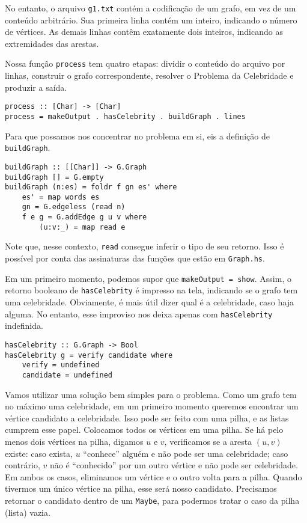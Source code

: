 \documentclass[a4paper]{article}
\begin{document}
No entanto, o arquivo \texttt{g1.txt} contém a codificação de um grafo, em vez de um conteúdo arbitrário.
Sua primeira linha contém um inteiro, indicando o número de vértices.
As demais linhas contêm exatamente dois inteiros, indicando as extremidades das arestas.

Nossa função \texttt{process} tem quatro etapas: dividir o conteúdo do arquivo por linhas, construir o grafo correspondente, resolver o Problema da Celebridade e produzir a saída.

\begin{verbatim}
process :: [Char] -> [Char]
process = makeOutput . hasCelebrity . buildGraph . lines
\end{verbatim}

Para que possamos nos concentrar no problema em si, eis a definição de \texttt{buildGraph}.

\begin{verbatim}
buildGraph :: [[Char]] -> G.Graph
buildGraph [] = G.empty
buildGraph (n:es) = foldr f gn es' where
	es' = map words es
	gn = G.edgeless (read n)
	f e g = G.addEdge g u v where
		(u:v:_) = map read e
\end{verbatim}

Note que, nesse contexto, \texttt{read} consegue inferir o tipo de seu retorno.
Isso é possível por conta das assinaturas das funções que estão em \texttt{Graph.hs}.

Em um primeiro momento, podemos supor que \texttt{makeOutput = show}. Assim, o retorno booleano de \texttt{hasCelebrity} é impresso na tela, indicando se o grafo tem uma celebridade.
Obviamente, é mais útil dizer qual é a celebridade, caso haja alguma.
No entanto, esse improviso nos deixa apenas com \texttt{hasCelebrity} indefinida.

\begin{verbatim}
hasCelebrity :: G.Graph -> Bool
hasCelebrity g = verify candidate where
	verify = undefined
	candidate = undefined
\end{verbatim}

Vamos utilizar uma solução bem simples para o problema.
Como um grafo tem no máximo uma celebridade, em um primeiro momento queremos encontrar um vértice candidato a celebridade.
Isso pode ser feito com uma pilha, e as listas cumprem esse papel.
Colocamos todos os vértices em uma pilha.
Se há pelo menos dois vértices na pilha, digamos $u$ e $v$, verificamos se a aresta $(u, v)$ existe:
caso exista, $u$ ``conhece'' alguém e não pode ser uma celebridade;
caso contrário, $v$ não é ``conhecido'' por um outro vértice e não pode ser celebridade.
Em ambos os casos, eliminamos um vértice e o outro volta para a pilha.
Quando tivermos um único vértice na pilha, esse será nosso candidato.
Precisamos retornar o candidato dentro de um \texttt{Maybe}, para podermos tratar o caso da pilha (lista) vazia.
\end{document}

